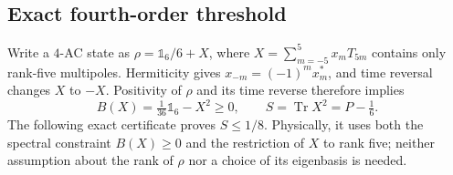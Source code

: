 \documentclass[11pt]{article}
\DeclareMathOperator{\Tr}{Tr}
\newcommand{\id}{\mathds{1}}
\begin{document}
\subsection{Exact fourth-order threshold}
\label{app:spin52_purity4}
Write a $4$-AC state as $\rho=\id_6/6+X$, where
$X=\sum_{m=-5}^{5}x_mT_{5m}$ contains only rank-five multipoles.
Hermiticity gives $x_{-m}=(-1)^mx_m^*$, and time reversal changes
$X$ to $-X$. Positivity of $\rho$ and its time reverse therefore implies
\begin{equation}
 B(X)=\tfrac1{36}\id_6-X^2\ge0,\qquad
 S=\Tr X^2=P-\tfrac16.
\end{equation}
The following exact certificate proves $S\le1/8$. Physically, it uses
both the spectral constraint $B(X)\ge0$ and the restriction of $X$ to
rank five; neither assumption about the rank of $\rho$ nor a choice of
its eigenbasis is needed.
\end{document}
